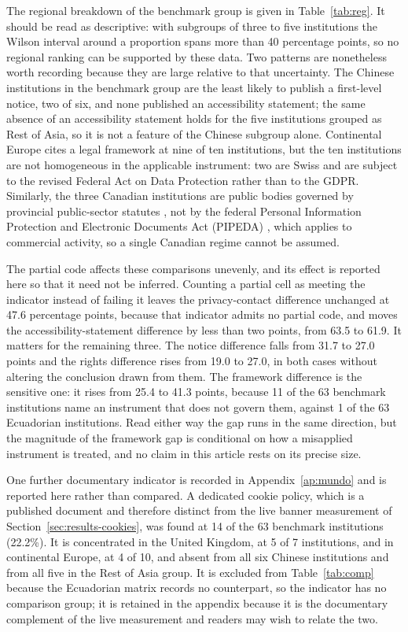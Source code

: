 \documentclass[pdflatex,sn-basic,Numbered,iicol]{sn-jnl}
\theoremstyle{thmstyleone}
\theoremstyle{thmstyletwo}
\theoremstyle{thmstylethree}
\begin{document}
The regional breakdown of the benchmark group is given in Table~\ref{tab:reg}. It should be read as descriptive: with subgroups of three to five institutions the Wilson interval around a proportion spans more than 40 percentage points, so no regional ranking can be supported by these data. Two patterns are nonetheless worth recording because they are large relative to that uncertainty. The Chinese institutions in the benchmark group are the least likely to publish a first-level notice, two of six, and none published an accessibility statement; the same absence of an accessibility statement holds for the five institutions grouped as Rest of Asia, so it is not a feature of the Chinese subgroup alone. Continental Europe cites a legal framework at nine of ten institutions, but the ten institutions are not homogeneous in the applicable instrument: two are Swiss and are subject to the revised Federal Act on Data Protection \citep{fadp_ch} rather than to the GDPR. Similarly, the three Canadian institutions are public bodies governed by provincial public-sector statutes \citep{fippa_on,fippa_bc,quebec_privacy}, not by the federal Personal Information Protection and Electronic Documents Act (PIPEDA) \citep{pipeda2000}, which applies to commercial activity, so a single Canadian regime cannot be assumed.

The partial code affects these comparisons unevenly, and its effect is reported here so that it need not be inferred. Counting a partial cell as meeting the indicator instead of failing it leaves the privacy-contact difference unchanged at 47.6 percentage points, because that indicator admits no partial code, and moves the accessibility-statement difference by less than two points, from 63.5 to 61.9. It matters for the remaining three. The notice difference falls from 31.7 to 27.0 points and the rights difference rises from 19.0 to 27.0, in both cases without altering the conclusion drawn from them. The framework difference is the sensitive one: it rises from 25.4 to 41.3 points, because 11 of the 63 benchmark institutions name an instrument that does not govern them, against 1 of the 63 Ecuadorian institutions. Read either way the gap runs in the same direction, but the magnitude of the framework gap is conditional on how a misapplied instrument is treated, and no claim in this article rests on its precise size.

One further documentary indicator is recorded in Appendix~\ref{ap:mundo} and is reported here rather than compared. A dedicated cookie policy, which is a published document and therefore distinct from the live banner measurement of Section~\ref{sec:results-cookies}, was found at 14 of the 63 benchmark institutions (22.2\%). It is concentrated in the United Kingdom, at 5 of 7 institutions, and in continental Europe, at 4 of 10, and absent from all six Chinese institutions and from all five in the Rest of Asia group. It is excluded from Table~\ref{tab:comp} because the Ecuadorian matrix records no counterpart, so the indicator has no comparison group; it is retained in the appendix because it is the documentary complement of the live measurement and readers may wish to relate the two.
\end{document}
